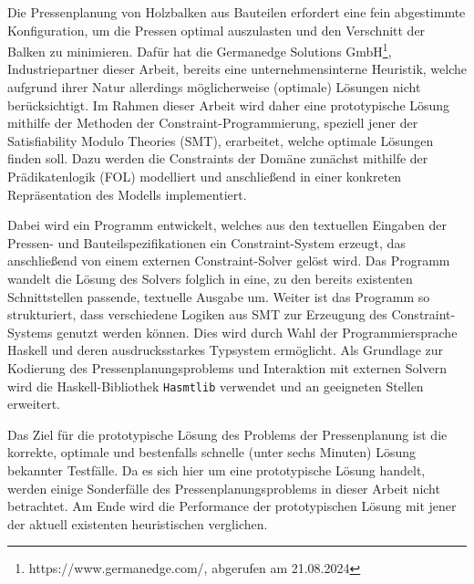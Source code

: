 \abstract
\label{sec:Abstrakt}

Die Pressenplanung von Holzbalken aus Bauteilen erfordert eine fein abgestimmte Konfiguration, um die Pressen optimal auszulasten und den Verschnitt der Balken zu minimieren.
Dafür hat die Germanedge Solutions GmbH\footnote{https://www.germanedge.com/, abgerufen am 21.08.2024}, Industriepartner dieser Arbeit, bereits eine unternehmensinterne Heuristik, welche aufgrund ihrer Natur allerdings möglicherweise (optimale) Lösungen nicht berücksichtigt.
Im Rahmen dieser Arbeit wird daher eine prototypische Lösung mithilfe der Methoden der Constraint-Programmierung, speziell jener der Satisfiability Modulo Theories (SMT), erarbeitet, welche optimale Lösungen finden soll.
Dazu werden die Constraints der Domäne zunächst mithilfe der Prädikatenlogik (FOL) modelliert und anschließend in einer konkreten Repräsentation des Modells implementiert.

Dabei wird ein Programm entwickelt, welches aus den textuellen Eingaben der Pressen- und Bauteilspezifikationen ein Constraint-System erzeugt, das anschließend von einem externen Constraint-Solver gelöst wird.
Das Programm wandelt die Lösung des Solvers folglich in eine, zu den bereits existenten Schnittstellen passende, textuelle Ausgabe um.
Weiter ist das Programm so strukturiert, dass verschiedene Logiken aus SMT zur Erzeugung des Constraint-Systems genutzt werden können.
Dies wird durch Wahl der Programmiersprache Haskell und deren ausdrucksstarkes Typsystem ermöglicht.
Als Grundlage zur Kodierung des Pressenplanungsproblems und Interaktion mit externen Solvern
wird die Haskell-Bibliothek \texttt{Hasmtlib} \cite{bruder} verwendet und an geeigneten Stellen erweitert.

Das Ziel für die prototypische Lösung des Problems der Pressenplanung ist die korrekte, optimale und bestenfalls schnelle (unter sechs Minuten) Lösung bekannter Testfälle.
Da es sich hier um eine prototypische Lösung handelt, werden einige Sonderfälle des Pressenplanungsproblems in dieser Arbeit nicht betrachtet.
Am Ende wird die Performance der prototypischen Lösung mit jener der aktuell existenten heuristischen verglichen.
